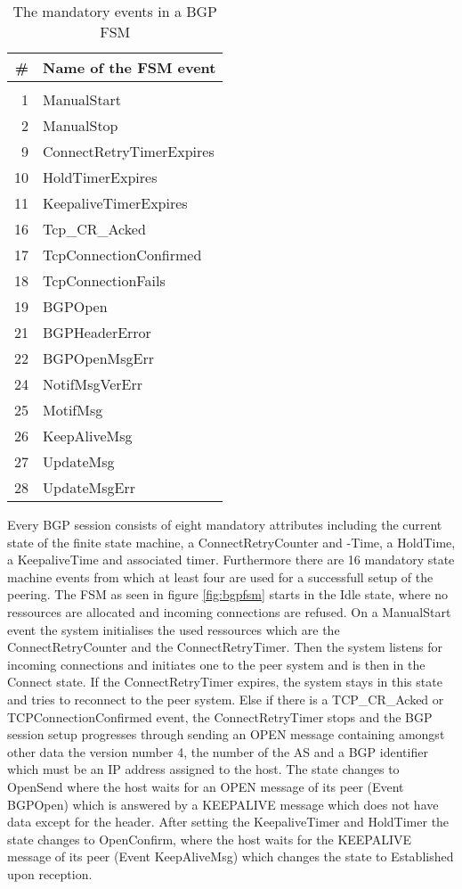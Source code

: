 \documentclass{acm_proc_article-sp}
\begin{document}
\begin{table}
\centering
    \begin{tabular}{r l}
    \# & Name of the FSM event    \\
    \hline                        \\
    1  & ManualStart              \\
    2  & ManualStop               \\
    9  & ConnectRetryTimerExpires \\
    10 & HoldTimerExpires         \\
    11 & KeepaliveTimerExpires    \\
    16 & Tcp\_CR\_Acked           \\
    17 & TcpConnectionConfirmed   \\
    18 & TcpConnectionFails       \\
    19 & BGPOpen                  \\
    21 & BGPHeaderError           \\
    22 & BGPOpenMsgErr            \\
    24 & NotifMsgVerErr           \\
    25 & MotifMsg                 \\
    26 & KeepAliveMsg             \\
    27 & UpdateMsg                \\
    28 & UpdateMsgErr             \\
    \end{tabular}
\caption{The mandatory events in a BGP FSM}
\label{tab:bgpfsmevent}
\end{table}

Every BGP session consists of eight mandatory attributes including the current state of the finite state machine, a ConnectRetryCounter and -Time, a HoldTime, a KeepaliveTime and associated timer. Furthermore there are 16 mandatory state machine events from which at least four are used for a successfull setup of the peering. The FSM as seen in figure \ref{fig:bgpfsm} starts in the Idle state, where no ressources are allocated and incoming connections are refused. On a ManualStart event the system initialises the used ressources which are the ConnectRetryCounter and the ConnectRetryTimer. Then the system listens for incoming connections and initiates one to the peer system and is then in the Connect state. If the ConnectRetryTimer expires, the system stays in this state and tries to reconnect to the peer system. Else if there is a TCP\_CR\_Acked or TCPConnectionConfirmed event, the ConnectRetryTimer stops and the BGP session setup progresses through sending an OPEN message containing amongst other data the version number 4, the number of the AS and a BGP identifier which must be an IP address assigned to the host. The state changes to OpenSend where the host waits for an OPEN message of its peer (Event BGPOpen) which is answered by a KEEPALIVE message which does not have data except for the header. After setting the KeepaliveTimer and HoldTimer the state changes to OpenConfirm, where the host waits for the KEEPALIVE message of its peer (Event KeepAliveMsg) which changes the state to Established upon reception.
\end{document}
